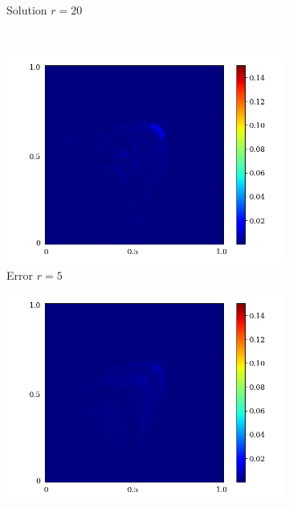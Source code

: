 \begin{figure}[ht!]
\begin{center}
\begin{subfigure}[b]{0.20\textwidth}
\begin{center}
            \end{center}
             \caption{Solution $r = 20$}
         \end{subfigure}\\  
         \begin{subfigure}[b]{0.20\textwidth}
             \begin{center}
                \includegraphics[trim = {0, 0, 3cm, 0}, clip, width=\textwidth]{Pictures/X-rom-LE-CNNAE-5-abs-err.png}
             \end{center}
             \caption{Error $r = 5$}
         \end{subfigure}  
         \begin{subfigure}[b]{0.20\textwidth}
             \begin{center}
                \includegraphics[trim = {0, 0, 3cm, 0}, clip, width=\textwidth]{Pictures/X-rom-LE-CNNAE-10-abs-err.png}

\end{center}
\end{subfigure}
\end{center}
\end{figure}
